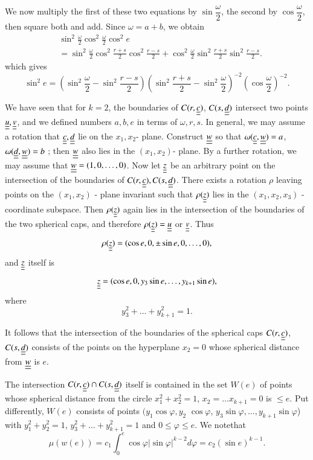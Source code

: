 We now multiply the first of these two equations by $\sin \dfrac{\omega}{2}$, the second by $\cos \dfrac{\omega}{2}$, then square both and add. Since $\omega = a+b$, we obtain
\begin{align*}
& \sin^{2} \frac{\omega}{2} \cos^{2} \frac{\omega}{2} \cos^{2} e\\
& = \sin^{2} \frac{\omega}{2} \cos^{2} \frac{r+s}{2} \cos^{2} \frac{r-s}{2} + \cos^{2} \frac{\omega}{2} \sin^{2} \frac{r+s}{2} \sin^{2} \frac{r-s}{2}.
\end{align*}
which gives
\begin{equation*}
\sin^{2} e = \left(\sin^{2} \frac{\omega}{2} - \sin^{2} \frac{r-s}{2}\right) \left(\sin^{2} \frac{r+s}{2} - \sin^{2} \frac{\omega}{2}\right)^{-2} \left(\cos \frac{\omega}{2}\right)^{-2}.\tag{11.4}\label{chap2:sec11:eq11.4}
\end{equation*}\pageoriginale

We have seen that for $k = 2$, the boundaries of $C(r, \underline{\underline{c}})$, $C(s, \underline{\underline{d}})$ intersect two points $\underline{\underline{u}}, \underline{\underline{v}}$, and we defined numbers $a, b, e$ in terms of $\omega, r, s$. In general, we may assume a rotation that $\underline{\underline{c}}, \underline{\underline{d}}$ lie on the $x_{1}, x_{2}$- plane. Construct $\underline{\underline{w}}$ so that $\omega (\underline{\underline{c}}, \underline{\underline{w}}) = a$, $\omega(\underline{\underline{d}}, \underline{\underline{w}}) = b$ ;  then $\underline{\underline{w}}$ also lies in the $(x_{1}, x_{2})$- plane. By a further rotation, we may assume that $\underline{\underline{w}} = (1, 0, \ldots, 0)$. Now let $\underline{\underline{z}}$  be an arbitrary point on the intersection of the boundaries of $C(r, \underline{\underline{c}}), C(s, \underline{\underline{d}})$. There exists a rotation $\rho$ leaving points on the $(x_{1}, x_{2})$ - plane invariant such that $\rho (\underline{\underline{z}})$ lies in the $(x_{1}, x_{2}, x_{3})$ - coordinate subspace. Then $\rho (\underline{\underline{z}})$ again lies in the intersection of the boundaries of the two spherical caps, and therefore $\rho(\underline{\underline{z}}) = \underline{\underline{u}}$ or $\underline{\underline{v}}$. Thus
$$
\rho (\underline{\underline{z}}) = (\cos e, 0, \pm \sin e, 0, \ldots, 0),
$$    
and $\underline{\underline{z}}$ itself is
$$
\underline{\underline{z}} = (\cos e, 0, y_{3} \sin e, \ldots, y_{k+1} \sin e),
$$
where
$$
y_{3}^{2} + \ldots + y_{k+1}^{2} = 1.
$$

It follows that the intersection of the boundaries of the spherical caps $C(r, \underline{\underline{c}})$, $C(s, \underline{\underline{d}})$ consists of the points on the hyperplane $x_{2} = 0$ whose spherical distance from $\underline{\underline{w}}$ is $e$.

The intersection $C(r, \underline{\underline{c}}) \cap C(s, \underline{\underline{d}})$ itself is contained in the set $W(e)$ of points whose spherical distance from the circle $x_{1}^{2} + x_{2}^{2} = 1$, $x_{2} = \ldots x_{k+1} = 0$ is $\leq e$. Put differently, $W(e)$ consists of points $(y_{1} \cos \varphi, y_{2}$ $\cos \varphi$, $y_{3} \sin \varphi, \ldots, y_{k+1} \sin \varphi$) with $y_{1}^{2} + y_{2}^{2} = 1$, $y_{3}^{2} + \ldots + y_{k+1}^{2} = 1$ and $0 \leq \varphi \leq e$. We note\pageoriginale that
$$
\mu(w(e)) = c_{1} \int_{0}^{e} \cos \varphi |\sin \varphi|^{k-2} d\varphi = c_{2} (\sin e)^{k-1}.
$$

